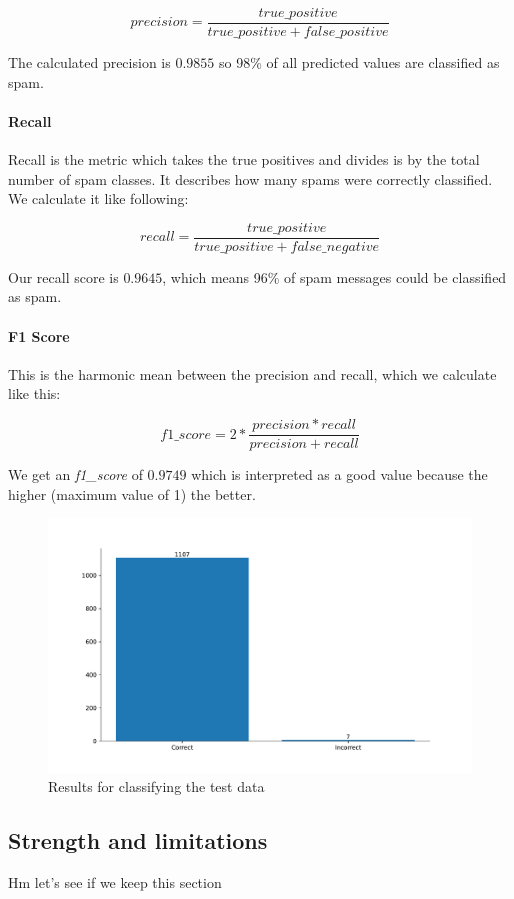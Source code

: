 $$precision = \frac{true\_positive}{true\_positive + false\_positive}$$

The calculated precision is $0.9855$ so 98\% of all predicted values are classified as spam. 

\paragraph{Recall}
Recall is the metric which takes the true positives and divides is by the total number of spam classes. It describes how many spams were correctly classified. We calculate it like following:

$$recall = \frac{true\_positive}{true\_positive + false\_negative}$$

Our recall score is $0.9645$, which means 96\% of spam messages could be classified as spam.

\paragraph{F1 Score}
This is the harmonic mean between the precision and recall, which we calculate like this:

$$f1\_score = 2 *  \frac{precision * recall}{precision + recall}$$

We get an \textit{f1\_score} of $0.9749$ which is interpreted as a good value because the higher (maximum value of 1) the better.

\begin{figure}[htbp]
  \centering
  \includegraphics[width=\textwidth]{images/bar_plot.pdf}
  \caption{Results for classifying the test data}
  \label{test-data-result}
\end{figure}

\subsection{Strength and limitations}
Hm let's see if we keep this section

